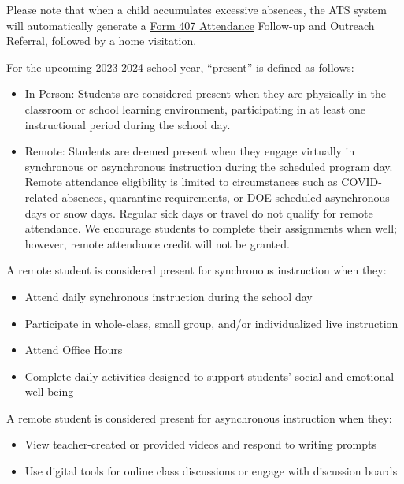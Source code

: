 \documentclass[letterpaper, 11pt]{article}
\begin{document}
Please note that when a child accumulates excessive absences, the ATS system will automatically generate a \href{https://www.schools.nyc.gov/docs/default-source/default-document-library/a-210-english.pdf}{Form 407 Attendance} Follow-up and Outreach Referral, followed by a home visitation.

For the upcoming 2023-2024 school year, ``present'' is defined as follows:
\begin{itemize}
\item In-Person: Students are considered present when they are physically in the classroom or school learning environment, participating in at least one instructional period during the school day.
\item Remote: Students are deemed present when they engage virtually in synchronous or asynchronous instruction during the scheduled program day. Remote attendance eligibility is limited to circumstances such as COVID-related absences, quarantine requirements, or DOE-scheduled asynchronous days or snow days. Regular sick days or travel do not qualify for remote attendance. We encourage students to complete their assignments when well; however, remote attendance credit will not be granted.
\end{itemize}

A remote student is considered present for synchronous instruction when they:
\begin{itemize}
\item Attend daily synchronous instruction during the school day
\item Participate in whole-class, small group, and/or individualized live instruction
\item Attend Office Hours
\item Complete daily activities designed to support students’ social and emotional well-being
\end{itemize}

A remote student is considered present for asynchronous instruction when they:
\begin{itemize}
\item View teacher-created or provided videos and respond to writing prompts
\item Use digital tools for online class discussions or engage with discussion boards
\end{itemize}
\end{document}
